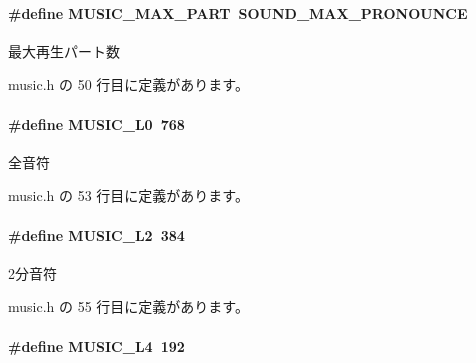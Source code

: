 \paragraph[{M\+U\+S\+I\+C\+\_\+\+M\+A\+X\+\_\+\+P\+A\+R\+T}]{\setlength{\rightskip}{0pt plus 5cm}\#define M\+U\+S\+I\+C\+\_\+\+M\+A\+X\+\_\+\+P\+A\+R\+T~{\bf S\+O\+U\+N\+D\+\_\+\+M\+A\+X\+\_\+\+P\+R\+O\+N\+O\+U\+N\+C\+E}}\label{music_8h_a219b820b86dd148d59b29a762f1d775a_a219b820b86dd148d59b29a762f1d775a}


最大再生パート数 



 music.\+h の 50 行目に定義があります。

\paragraph[{M\+U\+S\+I\+C\+\_\+\+L0}]{\setlength{\rightskip}{0pt plus 5cm}\#define M\+U\+S\+I\+C\+\_\+\+L0~768}\label{music_8h_a5b78950ab14bd552dbb539b8912dada4_a5b78950ab14bd552dbb539b8912dada4}


全音符 



 music.\+h の 53 行目に定義があります。

\paragraph[{M\+U\+S\+I\+C\+\_\+\+L2}]{\setlength{\rightskip}{0pt plus 5cm}\#define M\+U\+S\+I\+C\+\_\+\+L2~384}\label{music_8h_a4788b753af96dd3806987f9f43b2808c_a4788b753af96dd3806987f9f43b2808c}


2分音符 



 music.\+h の 55 行目に定義があります。

\paragraph[{M\+U\+S\+I\+C\+\_\+\+L4}]{\setlength{\rightskip}{0pt plus 5cm}\#define M\+U\+S\+I\+C\+\_\+\+L4~192}\label{music_8h_a1a06339426dad29d1eeb5a23b4be9726_a1a06339426dad29d1eeb5a23b4be9726}


